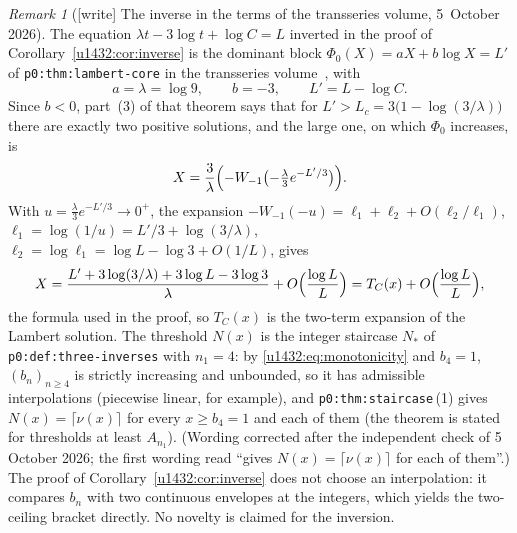 \documentclass[11pt]{article}
\theoremstyle{remark}\newtheorem{remark}[theorem]{Remark}
\newcommand{\file}[1]{\nolinkurl{#1}}
\begin{document}
\begin{remark}[{[write]} The inverse in the terms of the transseries volume, 5~October 2026]\label{u1432:rem:lambert}
The equation $\lambda t-3\log t+\log C=L$ inverted in the proof of
Corollary~\ref{u1432:cor:inverse} is the dominant block
$\Phi_0(X)=aX+b\log X=L'$ of \file{p0:thm:lambert-core} in the transseries
volume~\cite{TSvol}, with
\[
 a=\lambda=\log9,\qquad b=-3,\qquad L'=L-\log C .
\]
Since $b<0$, part~(3) of that theorem says that for
$L'>L_c=3\bigl(1-\log(3/\lambda)\bigr)$ there are exactly two positive
solutions, and the large one, on which $\Phi_0$ increases, is
\[
 X=\frac3\lambda\Bigl(-W_{-1}\bigl(-\tfrac\lambda3e^{-L'/3}\bigr)\Bigr).
\]
With $u=\frac\lambda3e^{-L'/3}\to0^+$, the expansion
$-W_{-1}(-u)=\ell_1+\ell_2+O(\ell_2/\ell_1)$, $\ell_1=\log(1/u)=L'/3+\log(3/\lambda)$,
$\ell_2=\log\ell_1=\log L-\log3+O(1/L)$, gives
\[
 X=\frac{L'+3\log(3/\lambda)+3\log L-3\log3}{\lambda}+O\Bigl(\frac{\log L}{L}\Bigr)
  =T_C(x)+O\Bigl(\frac{\log L}{L}\Bigr),
\]
the formula used in the proof, so $T_C(x)$ is the two-term expansion of the
Lambert solution. The threshold $N(x)$ is the integer staircase $N_\ast$ of
\file{p0:def:three-inverses} with $n_1=4$: by \eqref{u1432:eq:monotonicity}
and $b_4=1$, $(b_n)_{n\ge4}$ is strictly increasing and unbounded, so it has
admissible interpolations (piecewise linear, for example), and
\file{p0:thm:staircase}\,(1) gives $N(x)=\lceil\nu(x)\rceil$ for every
$x\ge b_4=1$ and each of them (the theorem is stated for thresholds at least
$A_{n_1}$). \textup{(Wording corrected after the independent check of 5 October 2026; the first wording read ``gives $N(x)=\lceil\nu(x)\rceil$ for each of them''.)}
The proof of Corollary~\ref{u1432:cor:inverse} does not choose an
interpolation: it compares $b_n$ with two continuous envelopes at the
integers, which yields the two-ceiling bracket directly. No novelty is
claimed for the inversion.
\end{remark}
\end{document}
